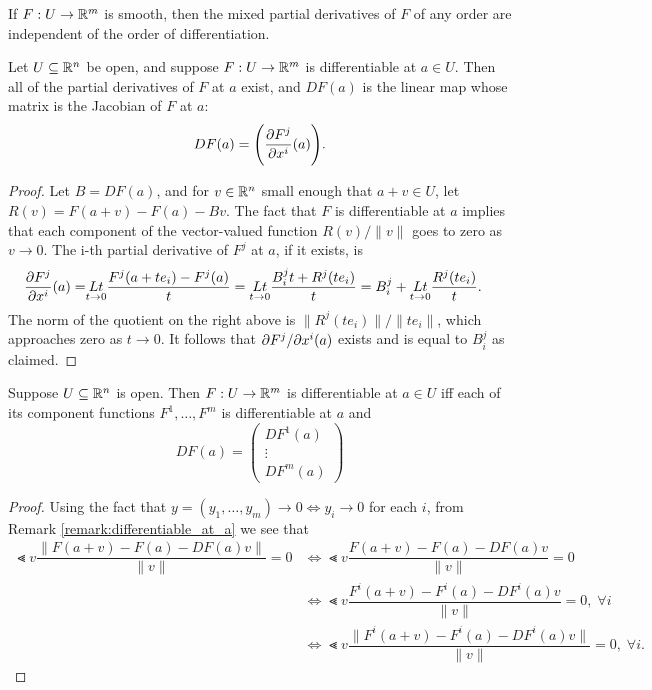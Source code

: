 \documentclass[11pt,a4paper]{article}
\begin{document}
\begin{corollary}
If $F:U\rightarrow \mathbb{R}^m$ is smooth, then the mixed partial derivatives of $F$ of any order are independent of the order of differentiation.
\end{corollary}

\begin{proposition}\label{prop:jacobian_matrix_form}
Let $U\subseteq \mathbb{R}^n$ be open, and suppose $F:U\rightarrow \mathbb{R}^m$ is differentiable at $a\in U$. Then all of the partial derivatives of $F$ at $a$ exist, and $DF(a)$ is the linear map whose matrix is the Jacobian of $F$ at $a$:
\begin{equation*}
DF(a) = \Bigg( \dfrac{\partial F^j}{\partial x^{i}}(a)\Bigg).
\end{equation*}
\end{proposition}

\begin{proof}
Let $B = DF(a)$, and for $v\in \mathbb{R}^n$ small enough that $a+v\in U$, let $R(v) = F(a+v)-F(a)-Bv$. The fact that $F$ is differentiable at $a$ implies that each component of the vector-valued function $R(v)/\|v\|$ goes to zero as $v\rightarrow 0$. The i-th partial derivative of $F^j$ at $a$, if it exists, is 
\begin{align*}
\dfrac{\partial F^j}{\partial x^{i}}(a) =& \underset{t\rightarrow 0}{Lt} \dfrac{F^j(a+te_i)-F^j(a)}{t} = \underset{t\rightarrow 0}{Lt} \dfrac{B_i^jt+R^j(te_i)}{t}
= B^j_i + \underset{t\rightarrow 0}{Lt} \dfrac{R^j(te_i)}{t}.
\end{align*}
The norm of the quotient on the right above is $\|R^j(te_i)\|/\|te_i\|$, which approaches zero as $t\rightarrow 0$. It follows that $\partial F^j/\partial x^{i}(a)$ exists and is equal to $B^j_i$ as claimed.
\end{proof}

\begin{proposition}
Suppose $U\subseteq \mathbb{R}^n$ is open. Then $F:U\rightarrow \mathbb{R}^m$ is differentiable at $a\in U$ iff each of its component functions $F^1,\ldots,F^m$ is differentiable at $a$ and 
\begin{equation*}
DF(a) = \left(
\begin{array}{c} 
DF^1(a) \\ 
\vdots  \\
DF^m(a)
\end{array} \right)
\end{equation*}
\end{proposition}

\begin{proof}
Using the fact that $y = (y_1,\ldots,y_m) \rightarrow 0 \Leftrightarrow y_i\rightarrow 0$ for each $i$, from Remark \ref{remark:differentiable_at_a} we see that
\begin{align*}
\Lt{v} \dfrac{\|F(a+v)-F(a)-DF(a)v\|}{\|v\|} = 0 &\Leftrightarrow 
\Lt{v} \dfrac{F(a+v)-F(a)-DF(a)v}{\|v\|} = 0 \\
&\Leftrightarrow 
\Lt{v} \dfrac{F^i(a+v)-F^i(a)-DF^i(a)v}{\|v\|} = 0,\;\forall i \\ 
&\Leftrightarrow 
\Lt{v} \dfrac{\|F^i(a+v)-F^i(a)-DF^i(a)v\|}{\|v\|} = 0,\;\forall i.
\end{align*}
\end{proof}
\end{document}
